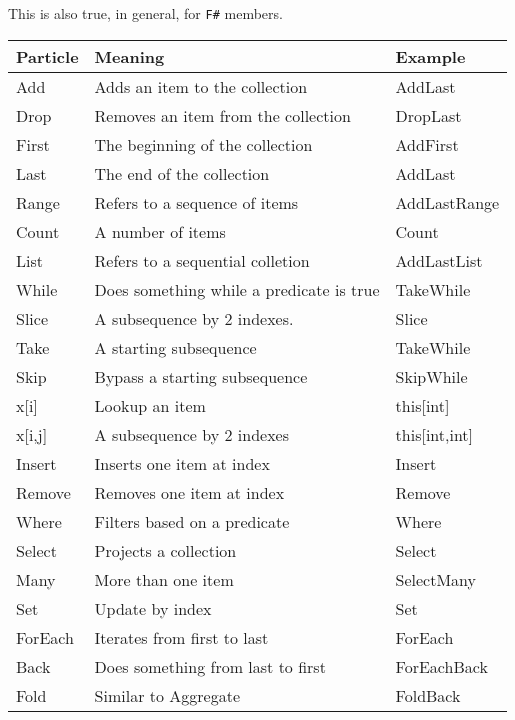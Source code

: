 \documentclass[]{article}
\newcommand{\codeformat}{\ttfamily}
\newcommand{\methodformat}{\codeformat\color{MidnightBlue}}
\newcommand{\method}[1]{{\methodformat #1}}
\newcommand{\fsh}{\texttt{F\#}\xspace}
\begin{document}
This is also true, in general, for \fsh members.
\begin{center}
	\newcommand{\supp}{\normalfont}
	\renewcommand{\r}{\relax}
	\begin{longtabu}{>{\codeformat}lXl}
		\supp Particle & Meaning & Example\\
		\hline
		Add         & Adds an item to the collection & \method{AddLast} \\
		Drop        & Removes an item from the collection & \method{DropLast} \\
		First       & The beginning of the collection & \method{AddFirst} \\
		Last        & The end of the collection & \method{AddLast} \\
		Range       & Refers to a sequence of items & \method{AddLastRange} \\
		Count       & A number of items & \method{Count} \\
		List        & Refers to a sequential colletion & \method{AddLastList} \\
		While       & Does something while a predicate is true & \method{TakeWhile} \\ 
		S\r lice    & A subsequence by 2 indexes. & \method{Slice} \\
		T\r ake     & A starting subsequence & \method{TakeWhile} \\
		S\r kip     & Bypass a starting subsequence & \method{SkipWhile} \\
		x[i]        &  Lookup an item & \method{this[int]}\\
		x[i,j]      & A subsequence by 2 indexes & \method{this[int,int]}\\
		I\r nsert   & Inserts one item at index & \method{Insert} \\
		R\r emove   & Removes one item at index & \method{Remove} \\
		W\r here & Filters based on a predicate & \method{Where} \\
		S\r elect & Projects a collection & \method{Select} \\
		Many & More than one item & \method{SelectMany} \\
		Set & Update by index & \method{Set} \\
		F\r orEach & Iterates from first to last & \method{ForEach} \\
		Back & Does something from last to first & \method{ForEachBack} \\
		F\r old & Similar to \method{Aggregate} & \method{FoldBack} \\
	\end{longtabu}
\end{center}
\end{document}
